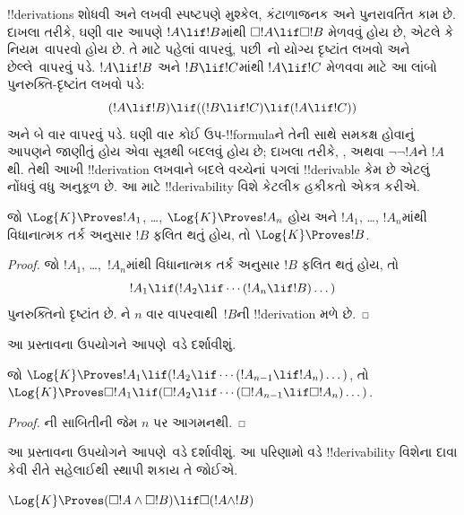 \documentclass[../../../include/open-logic-section]{subfiles}
\begin{document}


!!{derivation}s શોધવી અને લખવી સ્પષ્ટપણે મુશ્કેલ, કંટાળાજનક અને
પુનરાવર્તિત કામ છે. દાખલા તરીકે, ઘણી વાર આપણે $!A \lif !B$માંથી
$\Box !A \lif \Box !B$ મેળવવું હોય છે, એટલે કે નિયમ~\RK વાપરવો હોય
છે. તે માટે પહેલાં \Nec વાપરવું, પછી~નો યોગ્ય દૃષ્ટાંત લખવો
અને છેલ્લે~\MP વાપરવું પડે. $!A \lif
!B$ અને $!B \lif !C$માંથી $!A \lif !C$ મેળવવા માટે આ લાંબો
પુનરુક્તિ-દૃષ્ટાંત લખવો પડે:
\[
(!A \lif !B) \lif ((!B \lif !C) \lif (!A \lif !C))
\]
અને \MP{} બે વાર વાપરવું પડે. ઘણી વાર કોઈ ઉપ-!!{formula}ને તેની સાથે
સમકક્ષ હોવાનું આપણને જાણીતું હોય એવા સૂત્રથી બદલવું હોય છે; દાખલા
તરીકે, , અથવા
$\lnot\lnot !A$ને $!A$થી. તેથી આખી !!{derivation} લખવાને બદલે
વચ્ચેનાં પગલાં !!{derivable} કેમ છે એટલું નોંધવું વધુ અનુકૂળ છે. આ માટે
!!{derivability} વિશે કેટલીક હકીકતો એકત્ર કરીએ.

\begin{prop}
  જો $\Log{K} \Proves !A_1$, \dots, $\Log{K} \Proves !A_n$ હોય અને
  $!A_1$, \dots, $!A_n$માંથી વિધાનાત્મક તર્ક અનુસાર $!B$ ફલિત થતું હોય,
  તો $\Log{K} \Proves !B$.
\end{prop}

\begin{proof}
  જો $!A_1$, \dots,~$!A_n$માંથી વિધાનાત્મક તર્ક અનુસાર $!B$ ફલિત થતું હોય, તો
  \[
  !A_1 \lif (!A_2 \lif \cdots (!A_n \lif !B)\dots)
  \]
  પુનરુક્તિનો દૃષ્ટાંત છે. \MP{}ને $n$ વાર વાપરવાથી~$!B$ની
  !!{derivation} મળે છે.
\end{proof}

આ પ્રસ્તાવના ઉપયોગને આપણે~\PL વડે દર્શાવીશું.

\begin{prop}
  જો $\Log{K} \Proves !A_1 \lif (!A_2 \lif \cdots (!A_{n-1} \lif
  !A_n)\dots)$, તો $\Log{K} \Proves \Box !A_1 \lif (\Box !A_2 \lif
  \cdots (\Box !A_{n-1} \lif \Box !A_n)\dots)$.
\end{prop}

\begin{proof}
  ની સાબિતીની જેમ $n$ પર આગમનથી.
\end{proof}

આ પ્રસ્તાવના ઉપયોગને આપણે~\RK વડે દર્શાવીશું. આ પરિણામો વડે
!!{derivability} વિશેના દાવા કેવી રીતે સહેલાઈથી સ્થાપી શકાય તે જોઈએ.

\begin{prop}
  $\Log{K} \Proves (\Box!A \land \Box!B) \lif \Box (!A \land !B)$
\end{prop}
\end{document}

